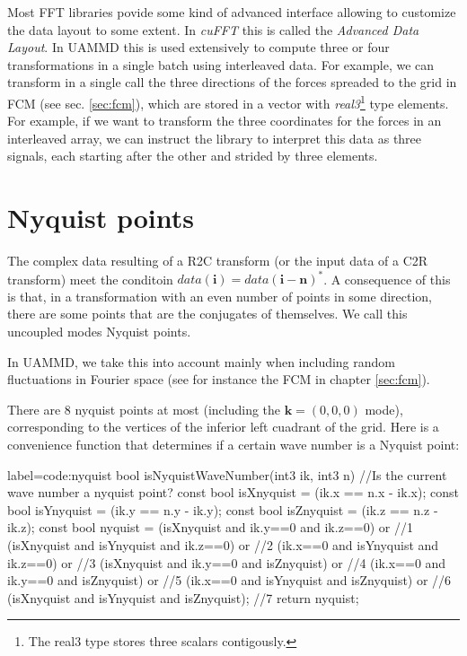 \documentclass[ twoside,openright,titlepage,numbers=noenddot,%
headinclude,footinclude,cleardoublepage=empty,abstract=on,
BCOR=5mm,paper=a4,fontsize=11pt, dvipsnames
]{scrreprt}
\renewcommand{\vec}[1]{\bm{#1}}
\newcommand{\uammd}{\gls{UAMMD}\xspace}
\begin{document}
Most \gls{FFT} libraries povide some kind of advanced interface allowing to customize the data layout to some extent. In \emph{cuFFT} this is called the \emph{Advanced Data Layout}. In \uammd this is used extensively to compute three or four transformations in a single batch using interleaved data. For example, we can transform in a single call the three directions of the forces spreaded to the grid in \gls{FCM} (see sec. \ref{sec:fcm}), which are stored in a vector with \emph{real3}\footnote{The real3 type stores three scalars contigously.} type elements.
For example, if we want to transform the three coordinates for the forces in an interleaved array, we can instruct the library to interpret this data as three signals, each starting after the other and strided by three elements.
\section*{Nyquist points}
The complex data resulting of a R2C transform (or the input data of a C2R transform) meet the conditoin $data(\vec{i}) = data(\vec{i} - \vec{n})^*$. A consequence of this is that, in a transformation with an even number of points in some direction, there are some points that are the conjugates of themselves. We call this uncoupled modes Nyquist points.

In \uammd, we take this into account mainly when including random fluctuations in Fourier space (see for instance the \gls{FCM} in chapter \ref{sec:fcm}).

There are $8$ nyquist points at most (including the $\vec{k} = (0,0,0)$ mode), corresponding to the vertices of the inferior left cuadrant of the grid.
Here is a convenience function that determines if a certain wave number is a Nyquist point:
\begin{code2}{label=code:nyquist}  
bool isNyquistWaveNumber(int3 ik, int3 n){
  //Is the current wave number a nyquist point?
  const bool isXnyquist = (ik.x == n.x - ik.x);
  const bool isYnyquist = (ik.y == n.y - ik.y);
  const bool isZnyquist = (ik.z == n.z - ik.z);
  const bool nyquist =  
    (isXnyquist and ik.y==0    and ik.z==0)    or //1
    (isXnyquist and isYnyquist and ik.z==0)    or //2
    (ik.x==0    and isYnyquist and ik.z==0)    or //3
    (isXnyquist and ik.y==0    and isZnyquist) or //4
    (ik.x==0    and ik.y==0    and isZnyquist) or //5
    (ik.x==0    and isYnyquist and isZnyquist) or //6
    (isXnyquist and isYnyquist and isZnyquist);   //7
  return nyquist;
}
\end{code2}
\end{document}
